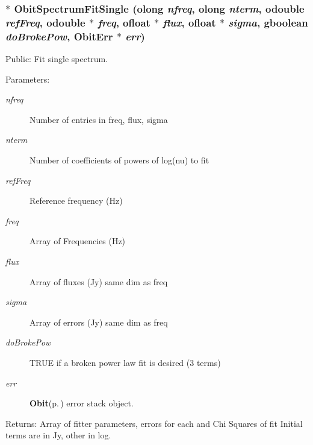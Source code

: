 \subsubsection{$\ast$ Obit\-Spectrum\-Fit\-Single ({\bf olong} {\em nfreq}, {\bf olong} {\em nterm}, {\bf odouble} {\em ref\-Freq}, {\bf odouble} $\ast$ {\em freq}, {\bf ofloat} $\ast$ {\em flux}, {\bf ofloat} $\ast$ {\em sigma}, gboolean {\em do\-Broke\-Pow}, {\bf Obit\-Err} $\ast$ {\em err})}\label{ObitSpectrumFit_8h_a17}


Public: Fit single spectrum. 

\begin{Desc}
\item[Parameters:]
\begin{description}
\item[{\em nfreq}]Number of entries in freq, flux, sigma \item[{\em nterm}]Number of coefficients of powers of log(nu) to fit \item[{\em ref\-Freq}]Reference frequency (Hz) \item[{\em freq}]Array of Frequencies (Hz) \item[{\em flux}]Array of fluxes (Jy) same dim as freq \item[{\em sigma}]Array of errors (Jy) same dim as freq \item[{\em do\-Broke\-Pow}]TRUE if a broken power law fit is desired (3 terms) \item[{\em err}]{\bf Obit}{\rm (p.\,\pageref{structObit})} error stack object. \end{description}
\end{Desc}
\begin{Desc}
\item[Returns:]Array of fitter parameters, errors for each and Chi Squares of fit Initial terms are in Jy, other in log. \end{Desc}
